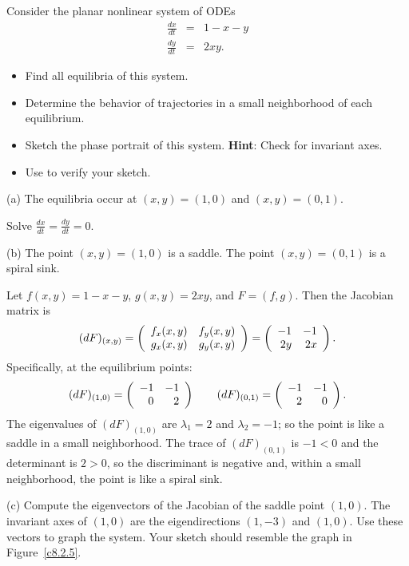 \documentclass{ximera}
\begin{document}
\begin{exercise} \label{c8.2.5}
Consider the planar nonlinear system of ODEs
\begin{eqnarray*}
\frac{dx}{dt} & = & 1 - x - y \\
\frac{dy}{dt} & = & 2xy. 
\end{eqnarray*}
\begin{itemize}
\item[(a)] Find all equilibria of this system.
\item[(b)] Determine the behavior of trajectories in a small
neighborhood of each equilibrium.
\item[(c)] Sketch the phase portrait of this system.  {\bf Hint}: Check
for invariant axes.
\item[(d)] Use {\pplane} to verify your sketch.
\end{itemize}

\begin{solution}

(a) \ans The equilibria occur at $(x,y) = (1,0)$ and $(x,y) = (0,1)$.

\soln Solve $\frac{dx}{dt} = \frac{dy}{dt} = 0$.

(b) \ans The point $(x,y) = (1,0)$ is a saddle.  The point $(x,y) = (0,1)$
is a spiral sink.

\soln Let $f(x,y) = 1 - x - y$, $g(x,y) = 2xy$,
and $F = (f,g)$.  Then the Jacobian matrix is
\[
(dF)_{(x,y)} = \left(\begin{array}{rr} f_x(x,y) & f_y(x,y)\\ g_x(x,y) &g_y(x,y)\end{array}\right)
= \left(\begin{array}{rr} -1 & -1\\ 2y &2x\end{array}\right).
\]
Specifically, at the equilibrium points:
\[
(dF)_{(1,0)} = \left(\begin{array}{rr} -1 & -1\\ 0 &2\end{array}\right) \qquad
(dF)_{(0,1)} = \left(\begin{array}{rr} -1 & -1\\ 2 &0\end{array}\right).
\]
The eigenvalues of $(dF)_{(1,0)}$ are $\lambda_1 = 2$ and $\lambda_2 = -1$;
so the point is like a saddle in a small neighborhood.  The trace of
$(dF)_{(0,1)}$ is $-1 < 0$ and the determinant is $2 > 0$, so the
discriminant is negative and, within a small neighborhood, the point
is like a spiral sink.

(c) Compute the eigenvectors of the Jacobian of the saddle point $(1,0)$.
The invariant axes of $(1,0)$ are the eigendirections $(1,-3)$ and
$(1,0)$.  Use these vectors to graph the system.  Your sketch should
resemble the {\pplane} graph in Figure~\ref{c8.2.5}.

\begin{figure}[htb]
                       \centerline{%
                       }
\end{figure}


\end{solution}
\end{exercise}
\end{document}
